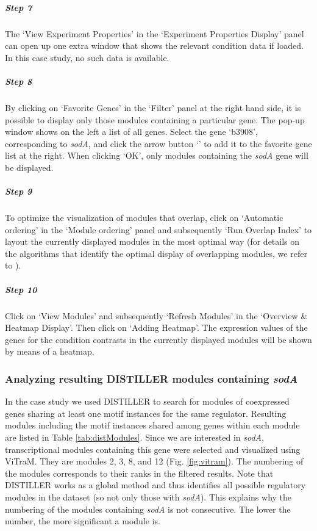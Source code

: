 \begin{adjustwidth}{3mm}{0cm}
\subparagraph{Step 7} The `View Experiment Properties' in the `Experiment 
Properties Display' 
panel can open up one extra window that shows the relevant condition data if 
loaded. In this case study, no such data is available.

\subparagraph{Step 8} By clicking on `Favorite Genes' in the `Filter' panel 
at the right hand side, it is possible to display only those modules containing 
a particular gene. 
The pop-up window shows on the left a list of all genes. Select the gene 
`b3908', corresponding to \textit{sodA}, and click the arrow button 
`\textrightarrow' to 
add it to the favorite gene list at the right. When clicking `OK', only modules 
containing the \textit{sodA} gene will be displayed.

\subparagraph{Step 9} To optimize the visualization of modules that 
overlap, click on `Automatic ordering' in the `Module ordering' panel and 
subsequently `Run Overlap Index' to layout the currently displayed modules in 
the most optimal way (for details on the algorithms that identify the optimal 
 display of overlapping modules, we refer to \cite{Sun2009}).

\subparagraph{Step 10} Click on `View Modules' and subsequently `Refresh 
Modules' in the `Overview \& Heatmap Display'. Then click on `Adding Heatmap'. 
The expression values of the genes for the condition contrasts in the currently 
displayed modules will be shown by means of a heatmap.
\end{adjustwidth}


\subsubsection{Analyzing resulting DISTILLER modules containing \textit{sodA}}

In the case study we used DISTILLER to search for modules of coexpressed
genes sharing at least one motif instances for the same regulator.
Resulting modules including the motif instances shared among genes
within each module are listed in Table \ref{tab:distModules}. 
Since we are interested in \textit{sodA}, transcriptional modules containing 
this gene were selected and visualized using ViTraM. 
They are modules 2, 3, 8, and 12 (Fig. \ref{fig:vitram}). 
The numbering of the modules corresponds to their ranks in the filtered
results. Note that DISTILLER works as a global method and thus
identifies all possible regulatory modules in the dataset (so not only
those with \textit{sodA}). This explains why the numbering of the modules
containing \textit{sodA} is not consecutive. The lower the number, the more
significant a module is.

